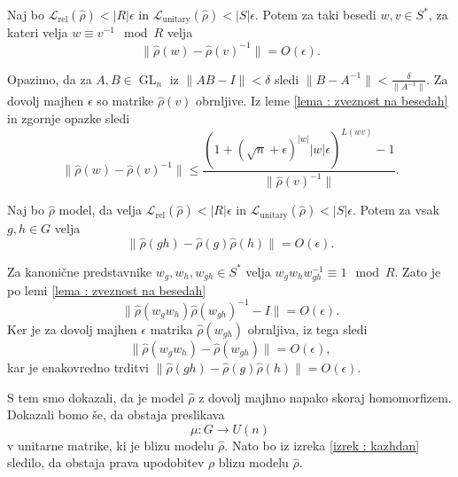 \documentclass[mat2, tisk]{fmfdelo}
\newcommand{\Loss}[1]{\mathcal L _\text{#1}}
\begin{document}
\begin{lema}
  Naj bo
  $\Loss{rel}(\hat \rho) < |R| \epsilon$ in $
  \Loss{unitary}(\hat \rho)  < |S| \epsilon$.
  Potem za taki besedi $w, v \in S^*$, za kateri velja
  $w \equiv v^{-1}\mod R$ velja
  $$
  \|\hat \rho(w) - \hat \rho(v)^{-1}\| = O(\epsilon).
  $$
\end{lema}
\begin{dokaz}
  Opazimo, da za $A, B \in \operatorname{GL}_n$ iz
  $\|AB-I\| < \delta$ sledi
  $\| B - A^{-1}\| < \frac{\delta}{\|A^{-1}\|}$.
  Za dovolj majhen $\epsilon$ so matrike $\hat \rho(v)$ obrnljive.
  Iz leme \ref{lema : zveznost na besedah} in zgornje opazke sledi
  $$
  \|\hat \rho(w) - \hat \rho(v)^{-1}\|
  \leq \frac{\left( 1 + (\sqrt{n} + \epsilon)^{|w|} |w| \epsilon
  \right)^{L(wv)} - 1}{\|\hat \rho(v)^{-1} \|}
  .
  $$
\end{dokaz}
%
\begin{lema}
  \label{lema : model ~ homomorfizem}
  Naj bo $\hat \rho$ model, da velja
  $\Loss{rel}(\hat \rho)  < |R|\epsilon$ in
  $\Loss{unitary}(\hat \rho) < |S|\epsilon$.
  Potem za vsak $g, h \in G$ velja
  $$
  \|\hat \rho(gh) - \hat \rho(g) \hat \rho(h)\| = O(\epsilon).
  $$
\end{lema}
\begin{dokaz}
  Za kanonične predstavnike $w_g, w_h, w_{gh} \in S^*$
  velja $w_g w_h w_{gh}^{-1} \equiv 1 \mod R$.
  Zato je po lemi \ref{lema : zveznost na besedah}
  $$
  \|\hat \rho(w_g w_h)\hat \rho(w_{gh})^{-1} - I\| = O(\epsilon).
  $$
  Ker je za dovolj majhen $\epsilon$ matrika $\hat \rho(w_{gh})$ obrnljiva,
  iz tega sledi
  $$
  \|\hat \rho(w_g w_h) - \hat \rho(w_{gh})\| = O(\epsilon),
  $$
  kar je enakovredno trditvi
  $\|\hat \rho(gh) - \hat \rho(g)\hat \rho(h)\| = O(\epsilon)$.
\end{dokaz}
%
%
S tem smo dokazali, da je model $\hat \rho$ z dovolj majhno napako
skoraj homomorfizem. Dokazali bomo še, da obstaja
preslikava $$\mu \colon G \to U(n)$$ v unitarne matrike,
ki je blizu modelu $\hat \rho$.
Nato bo iz izreka
\ref{izrek :
kazhdan} sledilo, da obstaja prava upodobitev $\rho$ blizu
modelu $\hat \rho$.
\end{document}
